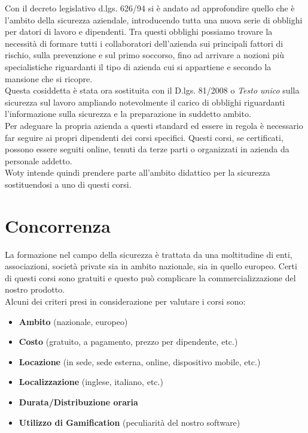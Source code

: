 Con il decreto legislativo d.lgs. 626/94 si è andato ad approfondire quello che è l'ambito della sicurezza aziendale, introducendo tutta una nuova serie di obblighi per datori di lavoro e dipendenti. Tra questi obblighi possiamo trovare la necessità di formare tutti i collaboratori dell'azienda sui principali fattori di rischio, sulla prevenzione e sul primo soccorso, fino ad arrivare a nozioni più specialistiche riguardanti il tipo di azienda cui si appartiene e secondo la mansione che si ricopre.\\
Questa cosiddetta  è stata ora sostituita con il D.lgs. 81/2008 o \textit{Testo unico} sulla sicurezza sul lavoro ampliando notevolmente il carico di obblighi riguardanti l'informazione sulla sicurezza e la preparazione in suddetto ambito.\\
Per adeguare la propria azienda a questi standard ed essere in regola è necessario far seguire ai propri dipendenti dei corsi specifici. Questi corsi, se certificati, possono essere seguiti online, tenuti da terze parti o organizzati in azienda da personale addetto.\\
Woty intende quindi prendere parte all'ambito didattico per la sicurezza sostituendosi a uno di questi corsi.


\section{Concorrenza}

La formazione nel campo della sicurezza è trattata da una moltitudine di enti, associazioni, società private sia in ambito nazionale, sia in quello europeo. Certi di questi corsi sono gratuiti e questo può complicare la
commercializzazione del nostro prodotto.\\

Alcuni dei criteri presi in considerazione per valutare i corsi sono:

\begin{itemize}
	\item \textbf{Ambito} (nazionale, europeo)
	\item \textbf{Costo} (gratuito, a pagamento, prezzo per dipendente, etc.)
	\item \textbf{Locazione} (in sede, sede esterna, online, dispositivo mobile, etc.)
	\item \textbf{Localizzazione} (inglese, italiano, etc.)
	\item \textbf{Durata/Distribuzione oraria}
	\item \textbf{Utilizzo di Gamification} (peculiarità del nostro software)
\end{itemize}

